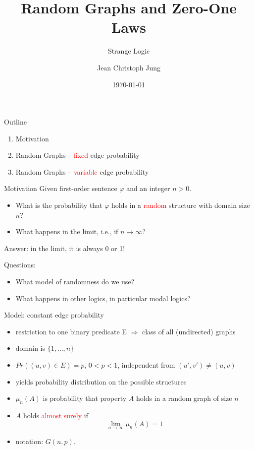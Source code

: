 \documentclass[handout]{beamer}
\title[Random Graphs]{Random Graphs and Zero-One Laws}
\subtitle{Strange Logic}
\author[J. Jung]{Jean Christoph Jung}
\institute[TdKI -- Uni Bremen]{Institut f\"ur Theorie der k\"unstlichen Intelligenz\\ Universit\"at Bremen}
\date{\today}
\renewcommand{\emph}[1]{\textcolor{red}{#1}}
\begin{document}
\titlepage

\begin{frame}{Outline}
\begin{enumerate}
\item Motivation
\item Random Graphs -- \emph{fixed} edge probability
\item Random Graphs -- \emph{variable} edge probability
\end{enumerate}
\end{frame}

\begin{frame}{Motivation}
Given first-order sentence $\varphi$ and an integer $n>0$. 

\begin{itemize}
\item What is the probability that $\varphi$ holds in a \emph{random} structure with domain size $n$?
\item What happens in the limit, \mbox{i.e.}, if $n\rightarrow\infty$?
\end{itemize}

\pause

Answer: in the limit, it is always 0 or 1!

\pause

Questions:
\begin{itemize}
\item What model of randomness do we use?
\item What happens in other logics, in particular modal logics?
\end{itemize}

\end{frame}

\begin{frame}{Model: constant edge probability}
\begin{itemize}
  \item restriction to one binary predicate E $\Rightarrow$ class of all (undirected) graphs 
  \item domain is $\{1,\ldots,n\}$
  \item $Pr( (u,v)\in E)=p$, $0<p<1$, independent from $(u',v')\neq(u,v)$
  \item yields probability distribution on the possible structures
  \item $\mu_n(A)$ is probability that property $A$ holds in a random graph of size $n$
  \item $A$ holds \emph{almost surely} if 
	$$\lim_{n\rightarrow\infty}\mu_n(A)=1$$
  \item notation: $G(n,p)$.
\end{itemize}
\end{frame}
\end{document}
